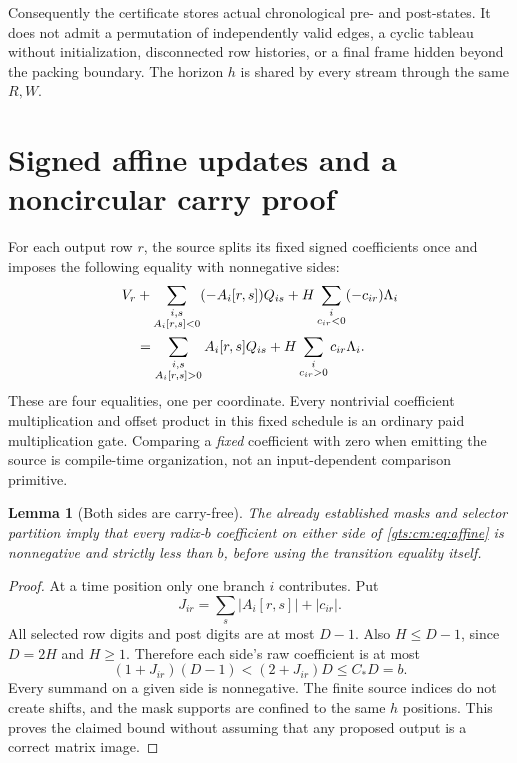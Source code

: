 \documentclass[11pt,letterpaper]{article}
\newtheorem{lemma}[theorem]{Lemma}
\theoremstyle{definition}
\theoremstyle{remark}
\begin{document}
Consequently the certificate stores actual chronological pre- and post-states. It does not admit a permutation of independently valid edges, a cyclic tableau without initialization, disconnected row histories, or a final frame hidden beyond the packing boundary. The horizon $h$ is shared by every stream through the same $R,W$.

\section{Signed affine updates and a noncircular carry proof}
\label{gts:cm:sec:carry}
For each output row $r$, the source splits its fixed signed coefficients once and imposes the following equality with nonnegative sides:
\begin{align}
 V_r&+\sum_{\substack{i,s\\ A_i[r,s]<0}}(-A_i[r,s])Q_{is}
       +H\sum_{\substack{i\\c_{ir}<0}}(-c_{ir})\Lambda_i \notag\\
 &=\sum_{\substack{i,s\\ A_i[r,s]>0}}A_i[r,s]Q_{is}
       +H\sum_{\substack{i\\c_{ir}>0}}c_{ir}\Lambda_i.
 \label{gts:cm:eq:affine}
\end{align}
These are four equalities, one per coordinate. Every nontrivial coefficient multiplication and offset product in this fixed schedule is an ordinary paid multiplication gate. Comparing a \emph{fixed} coefficient with zero when emitting the source is compile-time organization, not an input-dependent comparison primitive.

\begin{lemma}[Both sides are carry-free]\label{gts:cm:lem:carry}
The already established masks and selector partition imply that every radix-$b$ coefficient on either side of \eqref{gts:cm:eq:affine} is nonnegative and strictly less than $b$, before using the transition equality itself.
\end{lemma}
\begin{proof}
At a time position only one branch $i$ contributes. Put
\[
 J_{ir}=\sum_s|A_i[r,s]|+|c_{ir}|.
\]
All selected row digits and post digits are at most $D-1$. Also $H\le D-1$, since $D=2H$ and $H\ge1$. Therefore each side's raw coefficient is at most
\[
 (1+J_{ir})(D-1)<(2+J_{ir})D\le C_*D=b.
\]
Every summand on a given side is nonnegative. The finite source indices do not create shifts, and the mask supports are confined to the same $h$ positions. This proves the claimed bound without assuming that any proposed output is a correct matrix image.
\end{proof}
\end{document}
